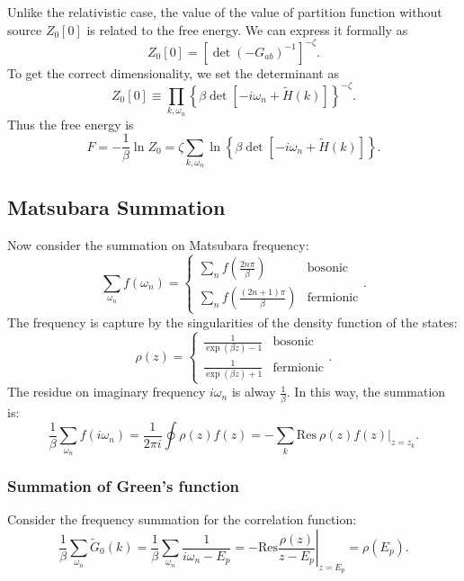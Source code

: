 \begin{framedrmk}
Unlike the relativistic case, the value of the value of partition function without source $Z_0[0]$ is related to the free energy.
We can express it formally as
\begin{equation*}
	Z_0[0]= \left[\det (-G_{ab})^{-1}\right]^{-\zeta}.
\end{equation*}
To get the correct dimensionality, we set the determinant as
\begin{equation*}
	Z_0[0] \equiv \prod_{k,\omega_n}\left\{\beta \det\left[-i\omega_n+\tilde{H}(k)\right]\right\}^{-\zeta}.
\end{equation*}
Thus the free energy is
\begin{equation}
	F = -\frac{1}{\beta} \ln Z_0
	= \zeta \sum_{k,\omega_n} \ln\left\{\beta\det\left[-i\omega_n+\tilde{H}(k)\right]\right\}.
\end{equation}
\end{framedrmk}

\subsection{Matsubara Summation}
Now consider the summation on Matsubara frequency:
\begin{equation}
	\sum_{\omega_n} f(\omega_n) = 
	\begin{cases}
		\sum_n f(\frac{2n\pi}{\beta}) & \mathrm{bosonic} \\
		\sum_n f(\frac{(2n+1)\pi}{\beta}) & \mathrm{fermionic}
	\end{cases}.
\end{equation}
The frequency is capture by the singularities of the density function of the states:
\begin{equation}
	\rho(z) = \begin{cases}
		\frac{1}{\exp(\beta z)-1} & \mathrm{bosonic} \\
		\frac{1}{\exp(\beta z)+1} & \mathrm{fermionic}
	\end{cases}.
\end{equation}
The residue on imaginary frequency $i\omega_n$ is alway $\frac{1}{\beta}$. In this way, the summation is:
\begin{equation}
	\frac{1}{\beta}\sum_{\omega_n} f(i\omega_n) 
	= \frac{1}{2\pi i} \oint \rho(z)f(z)
	= -\sum_{k} \mathrm{Res}\ \rho(z)f(z)|_{z=z_k}.
\end{equation}

\subsubsection*{Summation of Green's function}
Consider the frequency summation for the correlation function:
\begin{equation}
	\frac{1}{\beta}\sum_{\omega_n} \tilde{G}_0(k) 
	= \frac{1}{\beta}\sum_{\omega_n}\frac{1}{i\omega_n-E_{p}}
	= -\mathrm{Res} \left. \frac{\rho(z)}{z-E_{p}}\right|_{z=E_{p}}
	= \rho(E_{p}).
\end{equation}


